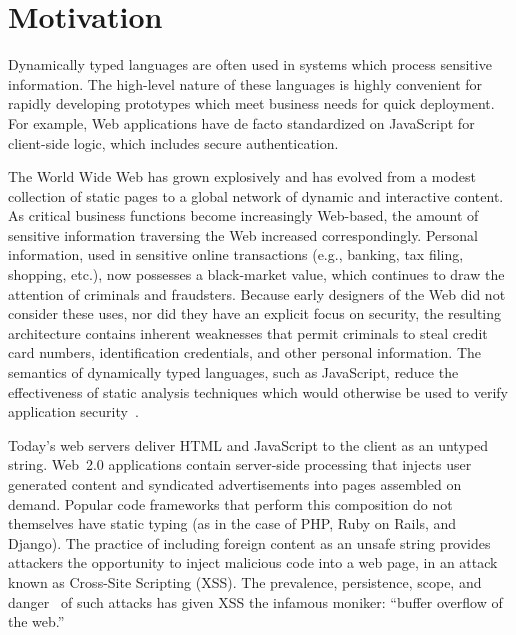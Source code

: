 \begin{comment}
\todo{categorize XSS?}
\begin{itemize}
    \item say that js handles sensitive info
    \item delineate injection
    \item categorize xss
    \item pound-include problem
    \item scare-monger prevalence as `buffer overflow'
    \item sandbox + same origin policy
    \item have to setup an attacker model?
\end{itemize}
\end{comment}

\chapter{Motivation}
\label{ch:motivation}

Dynamically typed languages are often used in systems which process sensitive information.
The high-level nature of these languages is highly convenient for rapidly developing prototypes which meet business needs for quick deployment.
For example, Web applications have de facto standardized on JavaScript for client-side logic, which includes secure authentication.

The World Wide Web has grown explosively and has evolved from a modest collection of static pages to a global network of dynamic and interactive content.
As critical business functions become increasingly Web-based, the amount of sensitive information traversing the Web increased correspondingly.
Personal information, used in sensitive online transactions (e.g., banking, tax filing, shopping, etc.), now possesses a black-market value, which continues to draw the attention of criminals and fraudsters.
Because early designers of the Web did not consider these uses, nor did they have an explicit focus on security, the resulting architecture contains inherent weaknesses that permit criminals to steal credit card numbers, identification credentials, and other personal information.
The semantics of dynamically typed languages, such as JavaScript, reduce the effectiveness of static analysis techniques which would otherwise be used to verify application security~\cite{robertson.vigna+09}.


Today's web servers deliver HTML and JavaScript to the client as an untyped string.
Web~2.0 applications contain server-side processing that injects user generated content and syndicated advertisements into pages assembled on demand.
Popular code frameworks that perform this composition do not themselves have static typing (as in the case of PHP, Ruby on Rails, and Django).
The practice of including foreign content as an unsafe string provides attackers the opportunity to inject malicious code into a web page, in an attack known as Cross-Site Scripting (XSS).
The prevalence, persistence, scope, and danger~\cite{whitehat, cwe} of such attacks has given XSS the infamous moniker: ``buffer overflow of the web.''

